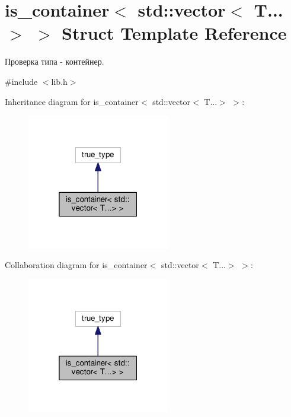\hypertarget{structis__container_3_01std_1_1vector_3_01T_8_8_8_4_01_4}{\section{is\-\_\-container$<$ std\-:\-:vector$<$ T...$>$ $>$ Struct Template Reference}
\label{structis__container_3_01std_1_1vector_3_01T_8_8_8_4_01_4}
}


Проверка типа -\/ контейнер.  




{\ttfamily \#include $<$lib.\-h$>$}



Inheritance diagram for is\-\_\-container$<$ std\-:\-:vector$<$ T...$>$ $>$\-:
\nopagebreak
\begin{figure}[H]
\begin{center}
\leavevmode
\includegraphics[width=176pt]{structis__container_3_01std_1_1vector_3_01T_8_8_8_4_01_4__inherit__graph}
\end{center}
\end{figure}


Collaboration diagram for is\-\_\-container$<$ std\-:\-:vector$<$ T...$>$ $>$\-:
\nopagebreak
\begin{figure}[H]
\begin{center}
\leavevmode
\includegraphics[width=176pt]{structis__container_3_01std_1_1vector_3_01T_8_8_8_4_01_4__coll__graph}
\end{center}
\end{figure}


